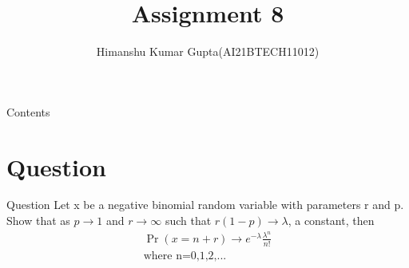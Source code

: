 \documentclass{beamer}
\title{Assignment 8}
\author{Himanshu Kumar Gupta(AI21BTECH11012)}
\providecommand{\brak}[1]{\ensuremath{\left(#1\right)}}
\begin{document}
\begin{frame}
\maketitle
\end{frame}
\begin{frame}{Contents}
\tableofcontents  
\section{Question}
\end{frame}
\begin{frame}{Question}
    Let x be a negative binomial random variable with parameters r and p. Show that as $p \to 1$ 
and $r\to \infty$ such that $r\brak{1 - p}\to \lambda$, a constant, then
\begin{align}
    \Pr\brak{x=n+r}\to e^{-\lambda}\frac{\lambda^n}{n!}   
  \nonumber\\
  \text{where n=0,1,2,...}   \nonumber
\end{align}
\end{frame}
\end{document}
